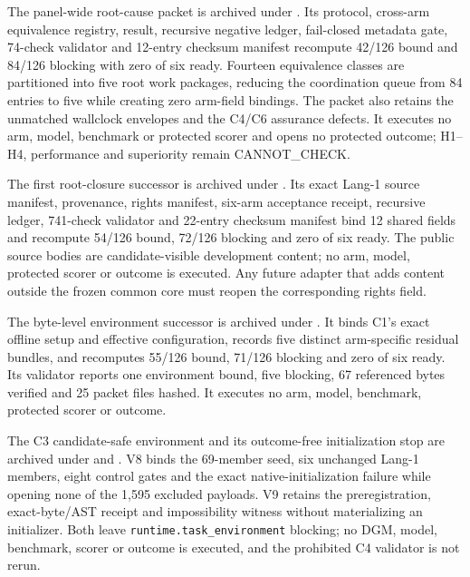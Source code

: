 The panel-wide root-cause packet is archived under
. Its protocol,
cross-arm equivalence registry, result, recursive negative ledger,
fail-closed metadata gate, 74-check validator and 12-entry checksum manifest
recompute 42/126 bound and 84/126 blocking with zero of six ready. Fourteen
equivalence classes are partitioned into five root work packages, reducing the
coordination queue from 84 entries to five while creating zero arm-field
bindings. The packet also retains the unmatched wallclock envelopes and the
C4/C6 assurance defects. It executes no arm, model, benchmark or protected
scorer and opens no protected outcome; H1--H4, performance and superiority
remain \textsf{CANNOT\_CHECK}.

The first root-closure successor is archived under
. Its exact
Lang-1 source manifest, provenance, rights manifest, six-arm acceptance
receipt, recursive ledger, 741-check validator and 22-entry checksum manifest
bind 12 shared fields and recompute 54/126 bound, 72/126 blocking and zero of
six ready. The public source bodies are candidate-visible development content;
no arm, model, protected scorer or outcome is executed. Any future adapter that
adds content outside the frozen common core must reopen the corresponding
rights field.

The byte-level environment successor is archived under
. It binds
C1's exact offline setup and effective configuration, records five distinct
arm-specific residual bundles, and recomputes 55/126 bound, 71/126 blocking
and zero of six ready. Its validator reports one environment bound, five
blocking, 67 referenced bytes verified and 25 packet files hashed. It executes
no arm, model, benchmark, protected scorer or outcome.

The C3 candidate-safe environment and its outcome-free initialization stop are
archived under
 and
. V8 binds the
69-member seed, six unchanged Lang-1 members, eight control gates and the exact
native-initialization failure while opening none of the 1,595 excluded payloads.
V9 retains the preregistration, exact-byte/AST receipt and impossibility witness
without materializing an initializer. Both leave
\texttt{runtime.task\_environment} blocking; no DGM, model, benchmark, scorer or
outcome is executed, and the prohibited C4 validator is not rerun.


